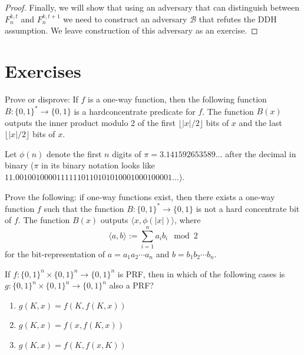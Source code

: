 \documentclass[12pt]{tufte-book}
\begin{document}
\begin{proof}
Finally, we will show that using an adversary that can distinguish between $F_n^{k,t}$ and $F_n^{k,t+1}$ we need to construct an adversary $\mathcal{B}$ that refutes the DDH assumption. We leave construction of this adversary as an exercise.
\end{proof}


\newpage
\section*{Exercises}
\begin{exercise}
\newcommand{\bit}{\{0,1\}}

Prove or disprove: If $f$ is a one-way function, then the following function $B:\bit^*\to\bit$ is a hardconcentrate predicate for $f$. The function $B(x)$ outputs the inner product modulo 2 of the first $\lfloor |x|/2\rfloor$ bits of $x$ and the last $\lfloor |x|/2\rfloor$ bits of $x$.
\end{exercise}

\begin{exercise}
Let $\phi(n)$ denote the first $n$ digits of $\pi = 3.141592653589\ldots$ after the decimal in binary ($\pi$ in its binary notation looks like $11.00100100001111110110101010001000100001\ldots$).

   Prove the following: if one-way functions exist, then there exists a one-way function $f$ such that the function $B:\{0,1\}^* \rightarrow \{0,1\}$ is not a hard concentrate bit of $f$. The function $B(x)$ outputs $\langle x, \phi(|x|)\rangle$, where
    \[\langle a, b\rangle := \sum_{i=1}^n a_i b_i \mod 2\]
    for the bit-representation of $a = {a_1a_2\cdots a_n}$ and $b= {b_1b_2\cdots b_n}$.
\end{exercise}

\begin{exercise}
 If $f: \{0,1\}^{n}\times \{0,1\}^n\rightarrow \{0,1\}^n$  is PRF, then in which of the following cases is $g: \{0,1\}^{n}\times \{0,1\}^n\rightarrow \{0,1\}^n$ also a PRF? \begin{enumerate} \item $g(K,x) = f(K,f(K,x))$ \item $g(K,x) = f(x,f(K,x))$ \item $g(K,x) = f(K,f(x,K))$
    \end{enumerate}
\end{exercise}
\end{document}
